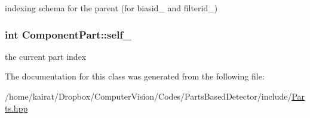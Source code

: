 indexing schema for the parent (for biasid\+\_\+ and filterid\+\_\+) 

\hypertarget{classComponentPart_a814391cfc1e60223f270d06e3bf2f8b6}{}
\subsubsection[{self\+\_\+}]{\setlength{\rightskip}{0pt plus 5cm}int Component\+Part\+::self\+\_\+\hspace{0.3cm}{\ttfamily [private]}}\label{classComponentPart_a814391cfc1e60223f270d06e3bf2f8b6}


the current part index 



The documentation for this class was generated from the following file\+:\begin{DoxyCompactItemize}
\item 
/home/kairat/\+Dropbox/\+Computer\+Vision/\+Codes/\+Parts\+Based\+Detector/include/\hyperlink{Parts_8hpp}{Parts.\+hpp}\end{DoxyCompactItemize}
